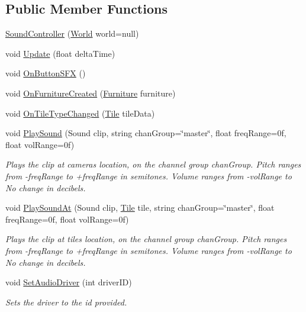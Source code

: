 \subsection*{Public Member Functions}
\begin{DoxyCompactItemize}
\item 
\hyperlink{class_sound_controller_aaf08d95a3300fb4e53ea2c118f07f821}{Sound\+Controller} (\hyperlink{class_world}{World} world=null)
\item 
void \hyperlink{class_sound_controller_ae855044aa3506d706299f79ec8dd48f3}{Update} (float delta\+Time)
\item 
void \hyperlink{class_sound_controller_a65991a17e33a3acd09126e63c432dbaa}{On\+Button\+S\+FX} ()
\item 
void \hyperlink{class_sound_controller_a0be0abc53e066a8cf60871eb95a861f9}{On\+Furniture\+Created} (\hyperlink{class_furniture}{Furniture} furniture)
\item 
void \hyperlink{class_sound_controller_aee57eaa6d86a32274d34c7933a02e911}{On\+Tile\+Type\+Changed} (\hyperlink{class_tile}{Tile} tile\+Data)
\item 
void \hyperlink{class_sound_controller_a53aebaef9113caabc4ea73891887efcd}{Play\+Sound} (Sound clip, string chan\+Group=\char`\"{}master\char`\"{}, float freq\+Range=0f, float vol\+Range=0f)
\begin{DoxyCompactList}\small\item\em Plays the clip at camera\textquotesingle{}s location, on the channel group chan\+Group. Pitch ranges from -\/freq\+Range to +freq\+Range in semitones. Volume ranges from -\/vol\+Range to No change in decibels. \end{DoxyCompactList}\item 
void \hyperlink{class_sound_controller_aa4afe682b4059c5d126a87c7aa2e86de}{Play\+Sound\+At} (Sound clip, \hyperlink{class_tile}{Tile} tile, string chan\+Group=\char`\"{}master\char`\"{}, float freq\+Range=0f, float vol\+Range=0f)
\begin{DoxyCompactList}\small\item\em Plays the clip at tile\textquotesingle{}s location, on the channel group chan\+Group. Pitch ranges from -\/freq\+Range to +freq\+Range in semitones. Volume ranges from -\/vol\+Range to No change in decibels. \end{DoxyCompactList}\item 
void \hyperlink{class_sound_controller_ab08659ec969cd9613d4b228c8ab1d6e4}{Set\+Audio\+Driver} (int driver\+ID)
\begin{DoxyCompactList}\small\item\em Sets the driver to the id provided. \end{DoxyCompactList}\item 

\end{DoxyCompactItemize}
